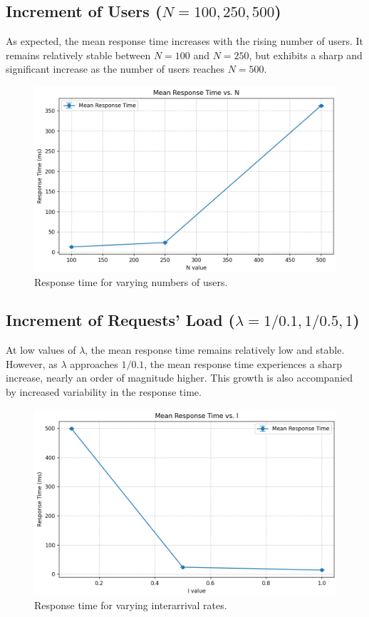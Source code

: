 \documentclass{report}
\begin{document}
\subsection{Increment of Users ($N = 100, 250, 500$)}\label{nusers}
As expected, the mean response time increases with the rising number of users. It remains relatively stable between $N = 100$ and $N = 250$, but exhibits a sharp and significant increase as the number of users reaches $N = 500$.

\begin{figure}[H]
    \centering
    \includegraphics[width=1\textwidth]{img/users_vary.png}
    \caption{Response time for varying numbers of users.}
\end{figure}

\subsection{Increment of Requests' Load ($\lambda = 1/0.1, 1/0.5, 1$)}
At low values of $\lambda$, the mean response time remains relatively low and stable. However, as $\lambda$ approaches $1/0.1$, the mean response time experiences a sharp increase, nearly an order of magnitude higher. This growth is also accompanied by increased variability in the response time.

\begin{figure}[H]
    \centering
    \includegraphics[width=1\textwidth]{img/lambda_vary.png}
    \caption{Response time for varying interarrival rates.}
\end{figure}
\end{document}
